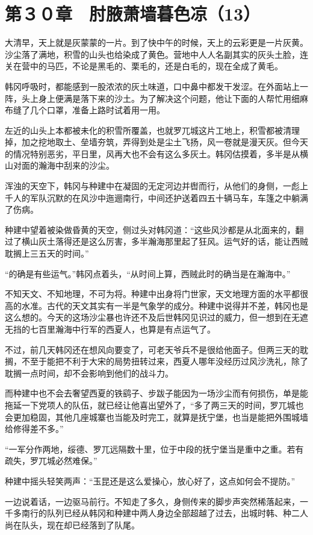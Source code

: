 \section{第３０章　肘腋萧墙暮色凉（13） }

大清早，天上就是灰蒙蒙的一片。到了快中午的时候，天上的云彩更是一片灰黄。沙尘落了满地，积雪的山头也给染成了黄色。营地中人人名副其实的灰头土脸，连关在营中的马匹，不论是黑毛的、栗毛的，还是白毛的，现在全成了黄毛。

韩冈呼吸时，都能感到一股浓浓的灰土味道，口中鼻中都发干发涩。在外面站上一阵，头上身上便满是落下来的沙土。为了解决这个问题，他让下面的人帮忙用细麻布缝了几个口罩，准备上路时试着用一用。

左近的山头上本都被未化的积雪所覆盖，也就罗兀城这片工地上，积雪都被清理掉，加之挖地取土、垒墙夯筑，弄得到处是尘土飞扬，风一卷就是漫天灰。但今天的情况特别恶劣，平日里，风再大也不会有这么多灰土。韩冈估摸着，多半是从横山对面的瀚海中刮来的沙尘。

浑浊的天空下，韩冈与种建中在凝固的无定河边并辔而行，从他们的身侧，一彪上千人的军队沉默的在风沙中迤逦南行，中间还护送着四五十辆马车，车篷之中躺满了伤病。

种建中望着被染做昏黄的天空，侧过头对韩冈道：“这些风沙都是从北面来的，翻过了横山灰土落得还是这么厉害，多半瀚海那里起了狂风。运气好的话，能让西贼耽搁上三五天的时间。”

“的确是有些运气。”韩冈点着头，“从时间上算，西贼此时的确当是在瀚海中。”

不知天文、不知地理，不可为将。种建中出身将门世家，天文地理方面的水平都很高的水准。古代的天文其实有一半是气象学的成分。种建中说得并不差，韩冈也是这么想的。今天的这场沙尘暴也许还不及后世韩冈见识过的威力，但一想到在无遮无挡的七百里瀚海中行军的西夏人，也算是有点运气了。

不过，前几天韩冈还在想风向要变了，可老天爷兵不是很给他面子。但两三天的耽搁，不至于能把不利于大宋的局势扭转过来，西夏人哪年没经历过风沙洗礼，除了耽搁一点时间，却不会影响到他们的战斗力。

而种建中也不会去奢望西夏的铁鹞子、步跋子能因为一场沙尘而有何损伤，单是能拖延一下党项人的队伍，就已经让他喜出望外了，“多了两三天的时间，罗兀城也会更加稳固，其他几座城寨也当能及时完工，就算是抚宁堡，也当是能把外围城墙给修得差不多。”

“一军分作两地，绥德、罗兀远隔数十里，位于中段的抚宁堡当是重中之重。若有疏失，罗兀城必然难保。”

种建中摇头轻笑两声：“玉昆还是这么爱操心，放心好了，这点如何会不提防。”

一边说着话，一边驱马前行。不知走了多久，身侧传来的脚步声突然稀落起来，一千多南行的队列已经从韩冈和种建中两人身边全部超越了过去，出城时韩、种二人尚在队头，现在却已经落到了队尾。


